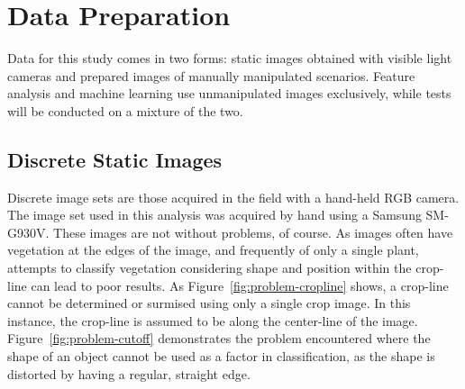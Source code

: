 \documentclass[letterpaper]{article}
\begin{document}
\section{Data Preparation}
Data for this study comes in two forms: static images obtained with visible light cameras and prepared images of manually manipulated scenarios.  Feature analysis and machine learning use unmanipulated images exclusively, while tests will be conducted on a mixture of the two.

\subsection{Discrete Static Images}
Discrete image sets are those acquired in the field with a hand-held RGB camera. The image set used in this analysis was acquired by hand using a Samsung SM-G930V. These images are not without problems, of course. As images often have vegetation at the edges of the image, and frequently of only a single plant, attempts to classify vegetation considering shape and position within the crop-line can lead to poor results. As Figure~\ref{fig:problem-cropline} shows, a crop-line cannot be determined or surmised using only a single crop image. In this instance, the crop-line is assumed to be along the center-line of the image. Figure~\ref{fig:problem-cutoff} demonstrates the problem encountered where the shape of an object cannot be used as a factor in classification, as the shape is distorted by having a regular, straight edge.
\end{document}
